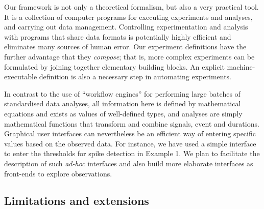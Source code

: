 Our framework is not only a theoretical formalism, but also a very
practical tool. It is a collection of computer programs for executing
experiments and analyses, and carrying out data
management. Controlling experimentation and analysis with programs
that share data formats is potentially highly efficient and eliminates
many sources of human error. Our experiment definitions have the
further advantage that they \emph{compose}; that is, more complex
experiments can be formulated by joining together elementary building
blocks. An explicit machine-executable definition is also a necessary
step in automating experiments. 

In contrast to the use of ``workflow engines'' for performing large
batches of standardised data analyses, all information here is defined
by mathematical equations and exists as values of well-defined types,
and analyses are simply mathematical functions that transform and
combine signals, event and durations. Graphical user interfaces can
nevertheless be an efficient way of entering specific values based on
the observed data. For instance, we have used a simple interface to
enter the thresholds for spike detection in Example 1. We plan to
facilitate the description of such \emph{ad-hoc} interfaces and also
build more elaborate interfaces as front-ends to explore observations.

\subsection*{Limitations and extensions}

